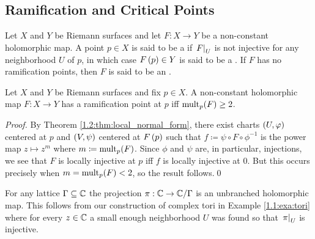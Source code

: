 \documentclass[../Moduli_Spaces_of_Riemann_Surfaces.tex]{subfiles}
\begin{document}
    \subsection{Ramification and Critical Points}
    \begin{definition}
        Let $X$ and $Y$ be Riemann surfaces and let $F:X\to Y$ be a non-constant holomorphic map. A point $p\in X$ is said to be a  if $\left.F\right|_U$ is not injective for any neighborhood $U$ of $p$, in which case $F\left(p\right)\in Y$ is said to be a . If $F$ has no ramification points, then $F$ is said to be an .
    \end{definition}
    \begin{proposition}\label{2.1:prp:ramification_iff_mult_2}
        Let $X$ and $Y$ be Riemann surfaces and fix $p\in X$. A non-constant holomorphic map $F:X\to Y$ has a ramification point at $p$ iff $\operatorname{mult}_p\!\left(F\right)\geq2$.
    \end{proposition}
    \begin{proof}
        By Theorem \ref{1.2:thm:local_normal_form}, there exist charts $\left(U,\varphi\right)$ centered at $p$ and $\left(V,\psi\right)$ centered at $F\left(p\right)$ such that $f\coloneqq\psi\circ F\circ\phi^{-1}$ is the power map $z\mapsto z^m$ where $m\coloneqq\operatorname{mult}_p\!\left(F\right)$. Since $\phi$ and $\psi$ are, in particular, injections, we see that $F$ is locally injective at $p$ iff $f$ is locally injective at $0$. But this occurs precisely when $m=\operatorname{mult}_p\!\left(F\right)<2$, so the result follows.\qed
    \end{proof}
    \begin{example}\label{2.1:exa:covering_of_torus}
        For any lattice $\Gamma\subseteq\mathbb{C}$ the projection $\pi:\mathbb{C}\to\mathbb{C}/\Gamma$ is an unbranched holomorphic map. This follows from our construction of complex tori in Example \ref{1.1:exa:tori} where for every $z\in\mathbb{C}$ a small enough neighborhood $U$ was found so that $\left.\pi\right|_U$ is injective.\exqed
    \end{example}
\end{document}
